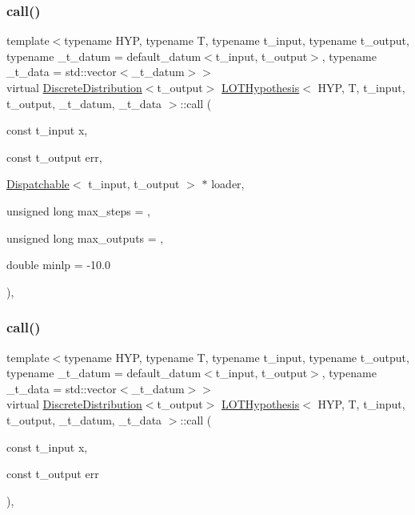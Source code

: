 \subsubsection{\texorpdfstring{call()}{call()}\hspace{0.1cm}{\footnotesize\ttfamily [1/2]}}
{\footnotesize\ttfamily template$<$typename H\+YP, typename T, typename t\+\_\+input, typename t\+\_\+output, typename \+\_\+t\+\_\+datum = default\+\_\+datum$<$t\+\_\+input, t\+\_\+output$>$, typename \+\_\+t\+\_\+data = std\+::vector$<$\+\_\+t\+\_\+datum$>$$>$ \\
virtual \hyperlink{class_discrete_distribution}{Discrete\+Distribution}$<$t\+\_\+output$>$ \hyperlink{class_l_o_t_hypothesis}{L\+O\+T\+Hypothesis}$<$ H\+YP, T, t\+\_\+input, t\+\_\+output, \+\_\+t\+\_\+datum, \+\_\+t\+\_\+data $>$\+::call (\begin{DoxyParamCaption}\item[{const t\+\_\+input}]{x,  }\item[{const t\+\_\+output}]{err,  }\item[{\hyperlink{class_dispatchable}{Dispatchable}$<$ t\+\_\+input, t\+\_\+output $>$ $\ast$}]{loader,  }\item[{unsigned long}]{max\+\_\+steps = {},  }\item[{unsigned long}]{max\+\_\+outputs = {},  }\item[{double}]{minlp = {\ttfamily -\/10.0} }\end{DoxyParamCaption})\hspace{0.3cm}{\ttfamily [inline]}, {\ttfamily [virtual]}}

\mbox{\label{class_l_o_t_hypothesis_a48858f5add54c1886d946e641b08062a}} 
\subsubsection{\texorpdfstring{call()}{call()}\hspace{0.1cm}{\footnotesize\ttfamily [2/2]}}
{\footnotesize\ttfamily template$<$typename H\+YP, typename T, typename t\+\_\+input, typename t\+\_\+output, typename \+\_\+t\+\_\+datum = default\+\_\+datum$<$t\+\_\+input, t\+\_\+output$>$, typename \+\_\+t\+\_\+data = std\+::vector$<$\+\_\+t\+\_\+datum$>$$>$ \\
virtual \hyperlink{class_discrete_distribution}{Discrete\+Distribution}$<$t\+\_\+output$>$ \hyperlink{class_l_o_t_hypothesis}{L\+O\+T\+Hypothesis}$<$ H\+YP, T, t\+\_\+input, t\+\_\+output, \+\_\+t\+\_\+datum, \+\_\+t\+\_\+data $>$\+::call (\begin{DoxyParamCaption}\item[{const t\+\_\+input}]{x,  }\item[{const t\+\_\+output}]{err }\end{DoxyParamCaption})\hspace{0.3cm}{\ttfamily [inline]}, {\ttfamily [virtual]}}

